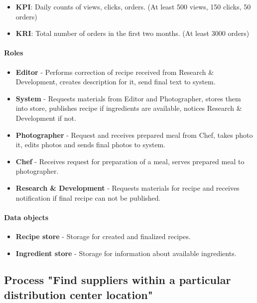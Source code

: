 \documentclass[11pt,a4paper]{article}
\begin{document}
\begin{itemize}
    \item \textbf{KPI}: Daily counts of views, clicks, orders. (At least 500 views, 150 clicks, 50 orders)
    \item \textbf{KRI}: Total number of orders in the first two months. (At least 3000 orders)
\end{itemize}

\paragraph{Roles}

\begin{itemize}
    \item \textbf{Editor} - Performs correction of recipe received from Research \& Development, creates description for it, send final text to system.
    \item \textbf{System} - Requests materials from Editor and Photographer, stores them into store, publishes recipe if ingredients are available, notices Research \& Development if not.
    \item \textbf{Photographer} - Request and receives prepared meal from Chef, takes photo it, edits photos and sends final photos to system.
    \item \textbf{Chef} - Receives request for preparation of a meal, serves prepared meal to photographer.
    \item \textbf{Research \& Development} - Requests materials for recipe and receives notification if final recipe can not be published.
\end{itemize}

\paragraph{Data objects}

\begin{itemize}
    \item \textbf{Recipe store} - Storage for created and finalized recipes.
    \item \textbf{Ingredient store} - Storage for information about available ingredients.
\end{itemize}

\newpage



\subsection{Process "Find suppliers within a particular distribution center location"}
\end{document}
